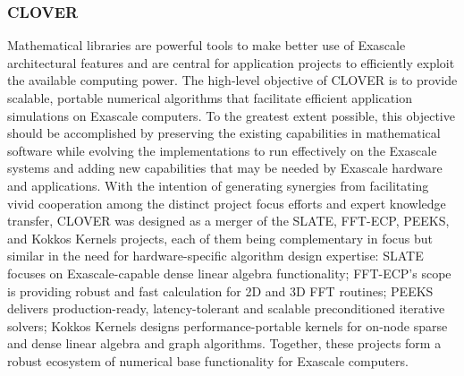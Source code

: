\subsubsection{ CLOVER} 
Mathematical libraries are powerful tools to make better use of Exascale 
architectural features and are central for application projects to efficiently 
exploit the available computing power. The high-level objective of CLOVER is to 
provide scalable, portable numerical algorithms that facilitate efficient 
application simulations on Exascale computers. To the greatest extent possible, 
this objective should be accomplished by preserving the existing capabilities 
in mathematical software while evolving the implementations to run effectively 
on the Exascale systems and adding new capabilities that may be needed by 
Exascale hardware and  applications. With the intention of generating synergies 
from facilitating vivid cooperation among the distinct project focus efforts 
and expert knowledge transfer, CLOVER was designed as a merger of the SLATE, 
FFT-ECP, PEEKS, and Kokkos Kernels projects, each of them being complementary 
in focus but similar in the need for hardware-specific algorithm design 
expertise: SLATE focuses on Exascale-capable dense linear algebra 
functionality; FFT-ECP’s scope is providing robust and fast calculation for 2D 
and 3D FFT routines; PEEKS delivers production-ready, latency-tolerant and 
scalable preconditioned iterative solvers; Kokkos Kernels designs 
performance-portable kernels for on-node sparse and dense linear algebra and 
graph algorithms. Together, these projects form a robust ecosystem of numerical 
base functionality for Exascale computers.
